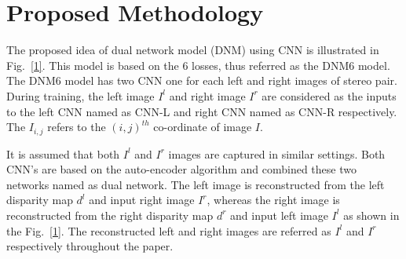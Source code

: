 \documentclass[10pt,twocolumn,letterpaper]{article}
\begin{document}
\section{Proposed Methodology}
The proposed idea of dual network model (DNM) using CNN is illustrated in Fig.~\ref{1}. This model is based on the 6 losses, thus referred as the DNM6 model. The DNM6 model has two CNN one for each left and right images of stereo pair. During training, the left image $I^l$ and right image $I^r$ are considered as the inputs to the left CNN named as CNN-L and right CNN named as CNN-R respectively. The $I_{i,j}$ refers to the $(i,j)^{th}$ co-ordinate of image $I$. 
\par
It is assumed that both $I^l$ and $I^r$ images are captured in similar settings. Both CNN's are based on the auto-encoder algorithm and combined these two networks named as dual network. The left image is reconstructed from the left disparity map $d^l$ and input right image $I^r$, whereas the right image is reconstructed from the right disparity map $d^r$ and input left image $I^l$ as shown in the Fig.~\ref{1}. The reconstructed left and right images are referred as $I^l$ and $I^r$ respectively throughout the paper.
\end{document}
